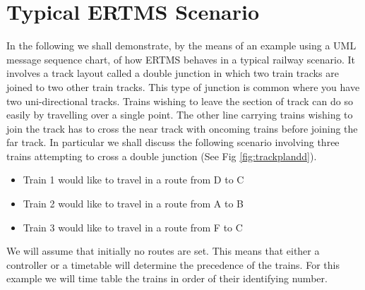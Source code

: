 \section{Typical  ERTMS Scenario}
In the following we shall demonstrate, by the means of an example using a UML message sequence chart, of how ERTMS behaves in a typical railway scenario. It involves a track layout called a double junction in which two train tracks are joined to two other train tracks. This type of junction is common where you have two uni-directional tracks. Trains wishing to leave the section of track can do so easily by travelling over a single point. The other line carrying trains wishing to join the track has to cross the near track with oncoming trains before joining the far track. In particular we shall discuss the following scenario involving three trains attempting to cross a double junction (See Fig \ref{fig:trackplandd}). 

\begin{itemize}
\item Train 1 would like to travel in a route from D to C
\item Train 2 would like to travel in a route from A to B
\item Train 3 would like to travel in a route from F to C
\end{itemize}

We will assume that initially no routes are set. This means that either a controller or a timetable will determine the precedence of the trains. For this example we will time table the trains in order of their identifying number.




